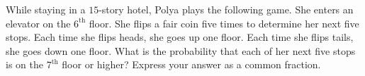While staying in a $15$-story hotel, Polya plays the following game. She enters an elevator on the $6^{\text{th}}$ floor. She flips a fair coin five times to determine her next five stops. Each time she flips heads, she goes up one floor. Each time she flips tails, she goes down one floor. What is the probability that each of her next five stops is on the $7^{\text{th}}$ floor or higher? Express your answer as a common fraction.
